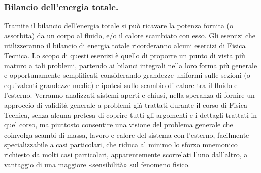 \documentclass[letterpaper,10pt,italian]{jupyterBook}
\begin{document}
\subsubsection{Bilancio dell’energia totale.}
\label{\detokenize{polimi/fluidmechanics-ita/template/capitoli/04_bilanci/0412in:bilancio-dell-energia-totale}}
\sphinxAtStartPar
Tramite il bilancio dell’energia totale si può ricavare la potenza
fornita (o assorbita) da un corpo al fluido, e/o il calore scambiato con
esso. Gli esercizi che utilizzeranno il bilancio di energia totale
ricorderanno alcuni esercizi di Fisica Tecnica. Lo scopo di questi
esercizi è quello di proporre un punto di vista più maturo a tali
problemi, partendo ai bilanci integrali nella loro forma più generale e
opportunamente semplificati considerando grandezze uniformi sulle
sezioni (o equivalenti grandezze medie) e ipotesi sullo scambio di
calore tra il fluido e l’esterno. Verranno analizzati sistemi aperti e
chiusi, nella speranza di fornire un approccio di validità generale a
problemi già trattati durante il corso di Fisica Tecnica, senza alcuna
pretesa di coprire tutti gli argomenti e i dettagli trattati in quel
corso, ma piuttosto consentire una visione del problema generale che
coinvolga scambi di massa, lavoro e calore del sistema con l’esterno,
facilmente specializzabile a casi particolari, che riduca al minimo lo
sforzo mnemonico richiesto da molti casi particolari, apparentemente
scorrelati l’uno dall’altro, a vantaggio di una maggiore «sensibilità»
sul fenomeno fisico.
\end{document}
